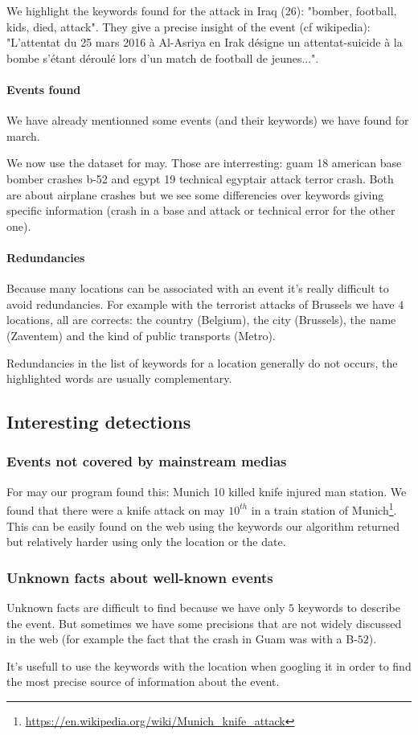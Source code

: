 \documentclass[a4paper]{article}
\begin{document}
We highlight the keywords found for the attack in Iraq (26): "bomber, football, kids, died, attack". They give a precise insight of the event (cf wikipedia): "L'attentat du 25 mars 2016 à Al-Asriya en Irak désigne un attentat-suicide à la bombe s'étant déroulé lors d'un match de football de jeunes...".

\paragraph{Events found}

We have already mentionned some events (and their keywords) we have found for march.

We now use the dataset for may.
Those are interresting: guam 18 american base bomber crashes b-52 and egypt 19 technical egyptair attack terror crash.
Both are about airplane crashes but we see some differencies over keywords giving specific information (crash in a base and attack or technical error for the other one).

\paragraph{Redundancies}

Because many locations can be associated with an event it's really difficult to avoid redundancies.
For example with the terrorist attacks of Brussels we have $4$ locations, all are corrects: the country (Belgium), the city (Brussels), the name (Zaventem) and the kind of public transports (Metro).

Redundancies in the list of keywords for a location generally do not occurs, the highlighted words are usually complementary.

\subsection{Interesting detections}

\subsubsection{Events not covered by mainstream medias}

For may our program found this: Munich 10 killed knife injured man station.
We found that there were a knife attack on may $10^{th}$ in a train station of Munich\footnote{\url{https://en.wikipedia.org/wiki/Munich_knife_attack}}. This can be easily found on the web using the keywords our algorithm returned but relatively harder using only the location or the date.

\subsubsection{Unknown facts about well-known events}

Unknown facts are difficult to find because we have only $5$ keywords to describe the event. But sometimes we have some precisions that are not widely discussed in the web (for example the fact that the crash in Guam was with a B-$52$).

It's usefull to use the keywords with the location when googling it in order to find the most precise source of information about the event.
\end{document}

